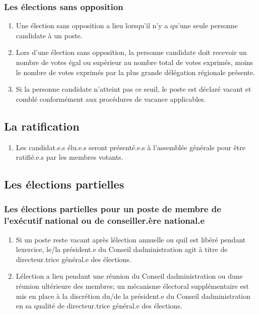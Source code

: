 \subsubsection{Les élections sans opposition}
\label{les-elections-sans-opposition}

\begin{enumerate}
 \item
  Une élection sans opposition a lieu lorsqu'il n'y a qu'une seule personne candidate à un poste.
 \item
  Lors d'une élection sans opposition, la personne candidate doit recevoir un nombre de votes égal ou supérieur au nombre total de votes exprimés, moins le nombre de votes exprimés par la plus grande délégation régionale présente.
 \item
  Si la personne candidate n'atteint pas ce seuil, le poste est déclaré vacant et comblé conformément aux procédures de vacance applicables.
\end{enumerate}

\subsection{La ratification}
\label{la-ratification}

\begin{enumerate}
 \item
  Les candidat.e.s élu.e.s seront présenté.e.s à l'assemblée générale pour être ratifié.e.s par les membres votants.
\end{enumerate}

\subsection{Les élections partielles}
\label{les-elections-partielles}

\subsubsection{Les élections partielles pour un poste de membre de l'exécutif national ou de conseiller.ère national.e}
\label{les-elections-partielles-pour-un-poste-de-membre-de-l-executif-national-ou-de-conseiller-ere-national-e}

\begin{enumerate}
 \item
  Si un poste reste vacant après l\textquotesingle élection annuelle ou qu\textquotesingle il est libéré pendant l\textquotesingle exercice, le/la président.e du Conseil d\textquotesingle administration agit à titre de directeur.trice général.e des élections.
 \item
  L\textquotesingle élection a lieu pendant une réunion du Conseil d\textquotesingle administration ou d\textquotesingle une réunion ultérieure des membres; un mécanisme électoral supplémentaire est mis en place à la discrétion du/de la président.e du Conseil d\textquotesingle administration en sa qualité de directeur.trice général.e des élections.
\end{enumerate}

